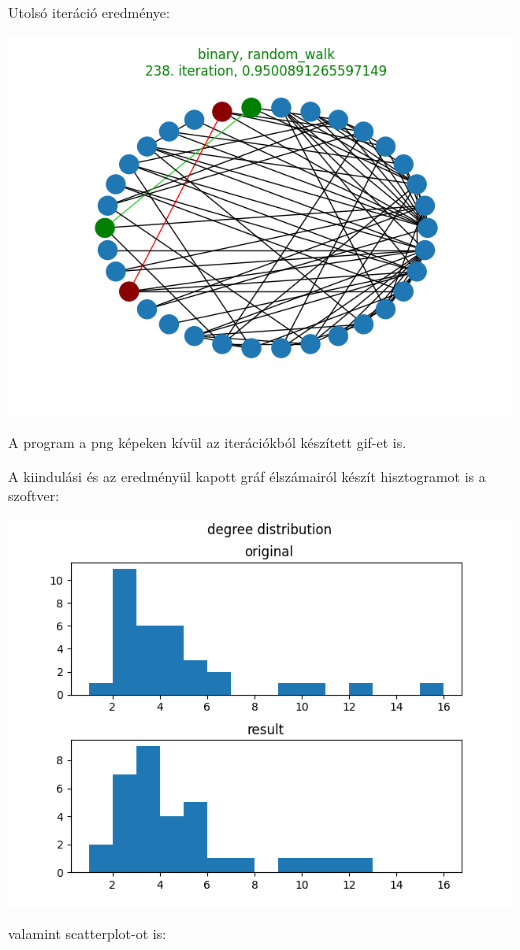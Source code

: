 \documentclass[12pt,numbers=noenddot]{report}
\begin{document}
\noindent
Utolsó iteráció eredménye:

\includegraphics[width=0.85\linewidth]{images/find_similar_end.png}

A program a png képeken kívül az iterációkból készített gif-et is.

\pagebreak

A kiindulási és az eredményül kapott gráf élszámairól készít hisztogramot is
a szoftver:

\hspace{1cm}

\includegraphics[width=0.95\linewidth]{images/find_similar_histogram.png}

\noindent
valamint scatterplot-ot is:
\end{document}
